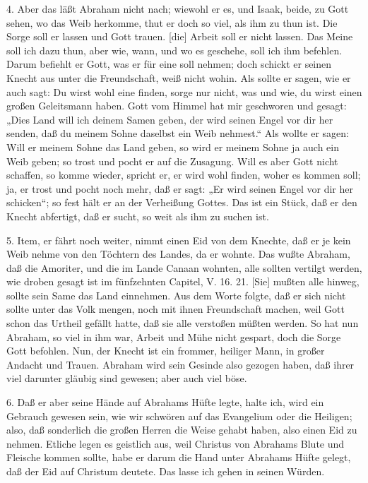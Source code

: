 4. Aber das läßt Abraham nicht nach; wiewohl er es, und Isaak, beide, zu Gott sehen, wo das Weib herkomme, thut er doch so viel, als ihm zu thun ist. Die Sorge soll er lassen und Gott trauen. [die] Arbeit soll er nicht lassen. Das Meine soll ich dazu thun, aber wie, wann, und wo es geschehe, soll ich ihm befehlen. Darum befiehlt er Gott, was er für eine soll nehmen; doch schickt er seinen Knecht aus unter die Freundschaft, weiß nicht wohin. Als sollte er sagen, wie er auch sagt: Du wirst wohl eine finden, sorge nur nicht, was und wie, du wirst einen großen Geleitsmann haben. Gott vom Himmel hat mir geschworen und gesagt: „Dies Land will ich deinem Samen geben, der wird seinen Engel vor dir her senden, daß du meinem Sohne daselbst ein Weib nehmest.“ Als wollte er sagen: Will er meinem Sohne das Land geben, so wird er meinem Sohne ja auch ein Weib geben; so trost und pocht er auf die Zusagung. Will es aber Gott nicht schaffen, so komme wieder, spricht er, er wird wohl finden, woher es kommen soll; ja, er trost und pocht noch mehr, daß er sagt: „Er wird seinen Engel vor dir her schicken“; so fest hält er an der Verheißung Gottes. Das ist ein Stück, daß er den Knecht abfertigt, daß er sucht, so weit als ihm zu suchen ist.

5. Item, er fährt noch weiter, nimmt einen Eid von dem Knechte, daß er je kein Weib nehme von den Töchtern des Landes, da er wohnte. Das wußte Abraham, daß die Amoriter, und die im Lande Canaan wohnten, alle sollten vertilgt werden, wie droben gesagt ist im fünfzehnten Capitel, V. 16. 21. [Sie] mußten alle hinweg, sollte sein Same das Land einnehmen. Aus dem Worte folgte, daß er sich nicht sollte unter das Volk mengen, noch mit ihnen Freundschaft machen, weil Gott schon das Urtheil gefällt hatte, daß sie alle verstoßen müßten werden. So hat nun Abraham, so viel in ihm war, Arbeit und Mühe nicht gespart, doch die Sorge Gott befohlen. Nun, der Knecht ist ein frommer, heiliger Mann, in großer Andacht und Trauen. Abraham wird sein Gesinde also gezogen haben, daß ihrer viel darunter gläubig sind gewesen; aber auch viel böse.

6. Daß er aber seine Hände auf Abrahams Hüfte legte, halte ich, wird ein Gebrauch gewesen sein, wie wir schwören auf das Evangelium oder die Heiligen; also, daß sonderlich die großen Herren die Weise gehabt haben, also einen Eid zu nehmen. Etliche legen es geistlich aus, weil Christus von Abrahams Blute und Fleische kommen sollte, habe er darum die Hand unter Abrahams Hüfte gelegt, daß der Eid auf Christum deutete. Das lasse ich gehen in seinen Würden.

